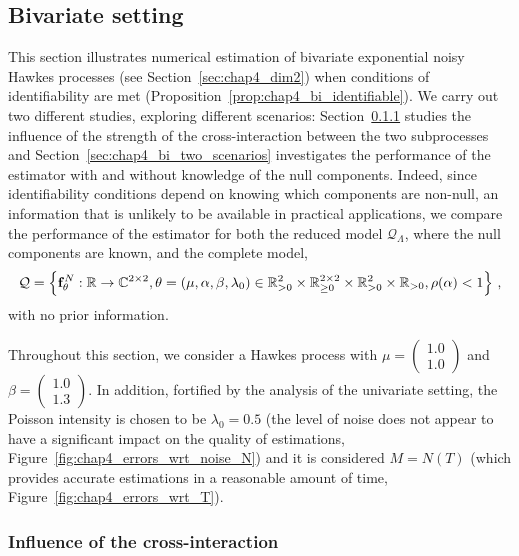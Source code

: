 	\subsection{Bivariate setting} \label{sec:chap4_bivariate_numerical_results}
		This section illustrates numerical estimation of bivariate exponential noisy Hawkes processes (see Section~\ref{sec:chap4_dim2}) when conditions of identifiability are met (Proposition~\ref{prop:chap4_bi_identifiable}). We carry out two different studies, exploring different scenarios: Section~\ref{sec:chap4_bi_alpha_parameter} studies the influence of the strength of the cross-interaction between the two subprocesses and Section~\ref{sec:chap4_bi_two_scenarios} investigates the performance of the estimator with and without knowledge of the null components. Indeed, since identifiability conditions depend on knowing which components are non-null, an information that is unlikely to be available in practical applications, we compare the performance of the estimator for both the reduced model $\mathcal{Q}_{\Lambda}$, where the null components are known, and the complete model, \[\mathcal Q
        = \left\{
          \mathbf{f}_{\theta}^N : {\mathbb R} \to \mathbb C^{2 \times 2},
          \theta = (\mu, \alpha, \beta, \lambda_0)
          \in {\mathbb R}_{>0}^2\times {\mathbb R}_{\geq 0}^{2\times 2} \times {\mathbb R}_{>0}^2 \times {\mathbb R}_{>0}, \rho(\alpha) < 1 
       	 \right\}\,,\]with no prior information.
		
    Throughout this section, we consider a Hawkes process with $\mu = \begin{pmatrix} 1.0 \\ 1.0 \end{pmatrix}$ and $\beta = \begin{pmatrix} 1.0 \\ 1.3 \end{pmatrix}$.
    In addition, fortified by the analysis of the univariate setting,
    the Poisson intensity is chosen to be $\lambda_0 = 0.5$
    (the level of noise does not appear to have a significant impact on the quality of estimations, Figure~\ref{fig:chap4_errors_wrt_noise_N})
    and it is considered $M = N(T)$ (which provides accurate estimations in a reasonable amount of time, Figure~\ref{fig:chap4_errors_wrt_T}).
		

		\subsubsection{Influence of the cross-interaction}
		\label{sec:chap4_bi_alpha_parameter} 

